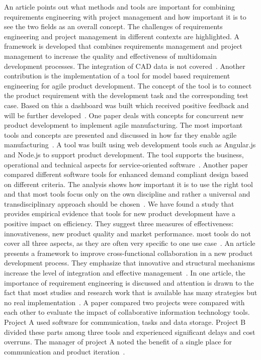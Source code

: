     An article points out what methods and tools are important for combining requirements engineering with project management and how important it is to see the two fields as an overall concept. The challenges of requirements engineering and project management in different contexts are highlighted. A framework is developed that combines requirements management and project management to increase the quality and effectiveness of multidomain development processes. The integration of CAD data is not covered~\cite{Jorma2014}.
    Another contribution is the implementation of a tool for model based requirement engineering for agile product development. The concept of the tool is to connect the product requirement with the development task and the corresponding test case. Based on this a dashboard was built which received positive feedback and will be further developed~\cite{WINDISCH2022550}.
    One paper deals with concepts for concurrent new product development to implement agile manufacturing. The most important tools and concepts are presented and discussed in how far they enable agile manufacturing~\cite{buyukozkan2004survey}.
    A tool was built using web development tools such as Angular.js and Node.js to support product development. The tool supports the business, operational and technical aspects for service-oriented software~\cite{belfadel2022requirements}.
    Another paper compared different software tools for enhanced demand compliant design based on different criteria. The analysis shows how important it is to use the right tool and that most tools focus only on the own discipline and rather a universal and transdisciplinary approach should be chosen~\cite{9447081}.
    We have found a study that provides empirical evidence that tools for new product development have a positive impact on efficiency. They suggest three measures of effectiveness: innovativeness, new product quality and market performance. most tools do not cover all three aspects, as they are often very specific to one use case~\cite{DURMUSOGLU2011321}.
    An article presents a framework to improve cross-functional collaboration in a new product development process. They emphasize that innovative and structural mechanisms increase the level of integration and effective management~\cite{Jassawalla}.
    In one article, the importance of requirement engineering is discussed and attention is drawn to the fact that most studies and research work that is available has many strategies but no real implementation~\cite{kumar2022requirements}.
    A paper compared two projects were compared with each other to evaluate the impact of collaborative information technology tools. Project A used software for communication, tasks and data storage. Project B divided these parts among three tools and experienced significant delays and cost overruns. The manager of project A noted the benefit of a single place for communication and product iteration~\cite{marion_fixson_2019}.

